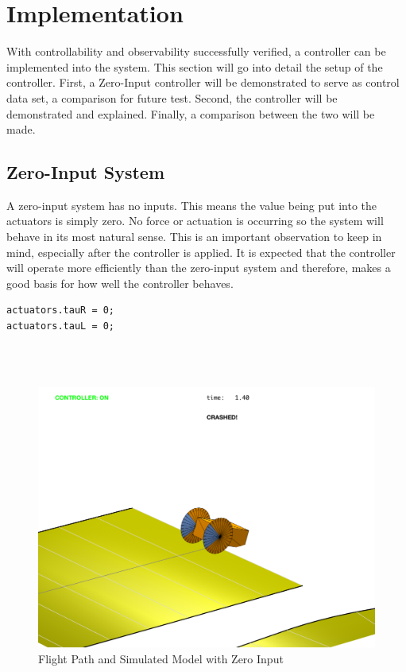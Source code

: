\documentclass[12pt]{article}
\begin{document}
\section{Implementation}
With controllability and observability successfully verified, a controller can be implemented into the system. This section will go into detail the setup of the controller. First, a Zero-Input controller will be demonstrated to serve as control data set, a comparison for future test. Second, the controller will be demonstrated and explained. Finally, a comparison between the two will be made.
\subsection{Zero-Input System}
A zero-input system has no inputs. This means the value being put into the actuators is simply zero. No force or actuation is occurring so the system will behave in its most natural sense. This is an important observation to keep in mind, especially after the controller is applied. It is expected that the controller will operate more efficiently than the zero-input system and therefore, makes a good basis for how well the controller behaves.
\\
\begin{lstlisting}[frame=single]
actuators.tauR = 0;
actuators.tauL = 0;
\end{lstlisting}
\\ \\ 
\begin{figure}
\includegraphics[width=1\textwidth]{zeroinput.pdf}
\centering
\caption{Flight Path and Simulated Model with Zero Input}
\label{zi}
\end{figure} 
\end{document}
